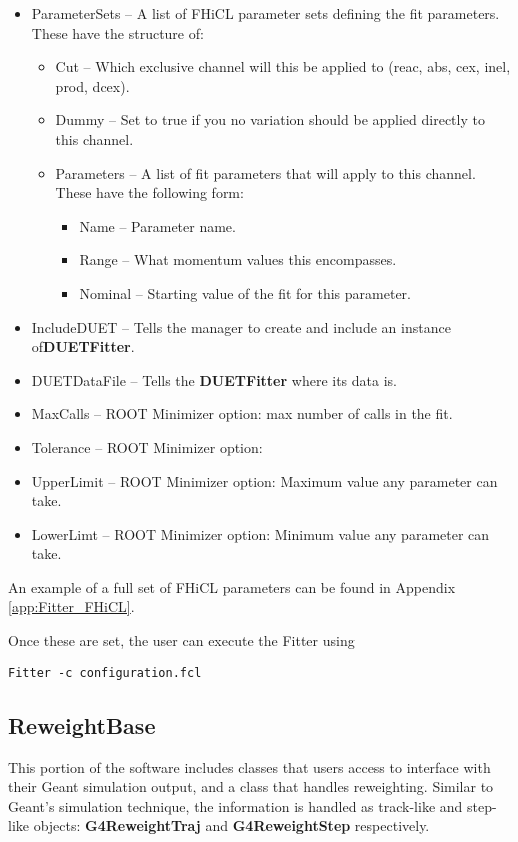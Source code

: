 \documentclass[12pt]{article}
\begin{document}
\begin{itemize}
\begin{itemize}
	\end{itemize}
	\item ParameterSets -- A list of FHiCL parameter sets defining the fit parameters. These have the structure of:
	\begin{itemize}
		\item Cut -- Which exclusive channel will this be applied to (reac, abs, cex, inel, prod, dcex).
		\item Dummy -- Set to true if you no variation should be applied directly to this channel.
		\item Parameters -- A list of fit parameters that will apply to this channel. These have the following form:
		\begin{itemize}
			\item Name -- Parameter name.
			\item Range -- What momentum values this encompasses.
			\item Nominal -- Starting value of the fit for this parameter. 
		\end{itemize}
    \end{itemize}	 
    
    \item IncludeDUET -- Tells the manager to create and include an instance of\textbf{DUETFitter}.
    \item DUETDataFile -- Tells the \textbf{DUETFitter} where its data is.
    \item MaxCalls -- ROOT Minimizer option: max number of calls in the fit.
    \item Tolerance -- ROOT Minimizer option:
    \item UpperLimit -- ROOT Minimizer option: Maximum value any parameter can take.
    \item LowerLimt -- ROOT Minimizer option: Minimum value any parameter can take.
\end{itemize}

An example of a full set of FHiCL parameters can be found in Appendix \ref{app:Fitter_FHiCL}.

Once these are set, the user can execute the Fitter using

\begin{lstlisting}
Fitter -c configuration.fcl
\end{lstlisting}

\subsection{ReweightBase}\label{ssec:ReweightBase}
This portion of the software includes classes that users access to interface with their Geant  simulation output, and a class that handles reweighting. Similar to Geant's simulation technique, the information is handled as track-like and step-like objects: \textbf{G4ReweightTraj} and \textbf{G4ReweightStep }respectively.
\end{document}
